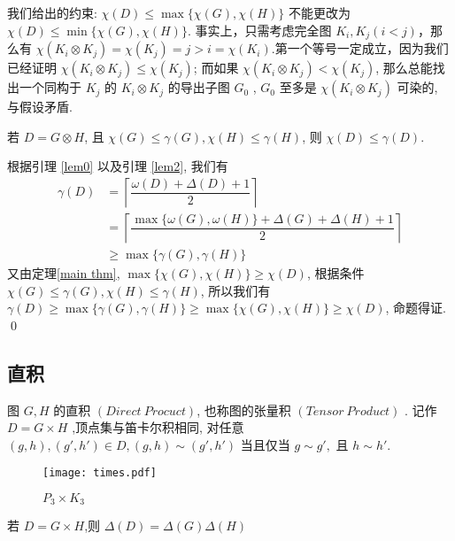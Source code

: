 \documentclass[12pt,a4paper]{article}%
\begin{document}
我们给出的约束: $\chi (D) \le \max \{\chi (G), \chi (H)\}$ 不能更改为 $\chi (D) \le \min \{\chi (G), \chi (H)\}$. 事实上，只需考虑完全图 $K_i,K_j(i < j)$，那么有 $\chi(K_i \otimes K_j) = \chi(K_j) = j > i = \chi(K_i)$.第一个等号一定成立，因为我们已经证明 $\chi(K_i \otimes K_j) \leq \chi(K_j)$; 而如果 $\chi(K_i \otimes K_j) < \chi(K_j)$, 那么总能找出一个同构于 $K_j$ 的 $K_i \otimes K_j$ 的导出子图 $G_0$ , $G_0$ 至多是 $\chi(K_i \otimes K_j)$ 可染的, 与假设矛盾.

\begin{thm}
    若 $D = G \otimes H$, 且 $\chi (G) \le \gamma (G), \chi (H) \le \gamma (H) $, 则 $\chi (D) \le \gamma (D)$.
\end{thm}
\begin{pf}
    根据引理 \ref{lem0} 以及引理 \ref{lem2}, 我们有 
    \begin{align*}
        \gamma(D) &= \left\lceil \dfrac{\omega (D) + \Delta (D) + 1}{2}  \right\rceil  \\
                &= \left\lceil \dfrac{\max\{ \omega (G),\omega (H)\} + \Delta (G) + \Delta (H) + 1}{2}  \right\rceil\\
                &\geq \max\{\gamma(G),\gamma(H)\}
    \end{align*}
    又由定理\ref{main thm}, $\max \{\chi (G), \chi (H)\} \geq \chi(D)$, 根据条件 $\chi (G) \le \gamma (G), \chi (H) \le \gamma (H) $, 所以我们有 $\gamma(D) \geq \max\{\gamma(G),\gamma(H)\} \geq \max \{\chi (G), \chi (H)\} \geq \chi(D)$, 命题得证. \qed
\end{pf}

\subsection{直积}
图 $G,H$ 的直积 $(Direct \ Procuct)$, 也称图的张量积 $(Tensor \ Product)$ . 记作 $D = G \times H$ ,顶点集与笛卡尔积相同, 对任意$(g,h), (g',h') \in D, (g,h) \sim (g',h')$ 当且仅当 $g \sim g',$ 且 $ h \sim h'$.

\begin{figure}[b]
\begin{center}
\texttt{[image: times.pdf]}
\caption{$P_3\times K_3$}
\label{times_pic}
\end{center}
\end{figure}

\begin{lemma}\label{lem21}
    若 $D = G \times H$,则 $\Delta(D) = \Delta(G) \Delta(H)$
\end{lemma}
    
\end{document}
